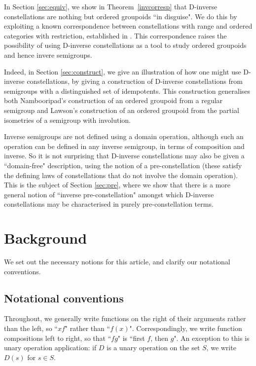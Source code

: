 \documentclass[12pt]{amsart}
\theoremstyle{definition}
\begin{document}
In Section \ref{sec:equiv}, we show in Theorem~\ref{invcorresp} that D-inverse constellations are nothing but ordered groupoids ``in disguise".  We do this by exploiting a known correspondence between constellations with range and ordered categories with restriction, established in \cite{constrange}.  This correspondence raises the possibility of using D-inverse constellations as a tool to study ordered groupoids and hence invere semigroups.  

 Indeed, in Section \ref{sec:construct}, we give an illustration of how one might use D-inverse constellations, by giving a construction of D-inverse constellations from semigroups with a distinguished set of idempotents.  This construction generalises both Nambooripad's construction of an ordered groupoid from a regular semigroup and Lawson's construction of an ordered groupoid from the partial isometries of a semigroup with involution.

Inverse semigroups are not defined using a domain operation, although such an operation can be defined in any inverse semigroup, in terms of composition and inverse.  So it is not surprising that D-inverse constellations may also be given a ``domain-free" description, using the notion of a pre-constellation (these satisfy the defining laws of constellations that do not involve the domain operation).  This is the subject of Section \ref{sec:pre}, where we show that there is a more general notion of ``inverse pre-constellation" amongst which D-inverse constellations may be characterised in purely pre-constellation terms.

\section{Background} \label{sec:back}   

We set out the necessary notions for this article, and clarify our notational conventions.

\subsection{Notational conventions}

Throughout, we generally write functions on the right of their arguments rather than the left, so ``$xf$" rather than ``$f(x)$".  Correspondingly, we write function compositions left to right, so that ``$fg$" is ``first $f$, then $g$".  An exception to this is unary operation application: if $D$ is a unary operation on the set $S$, we write $D(s)$ for $s\in S$.
\end{document}
